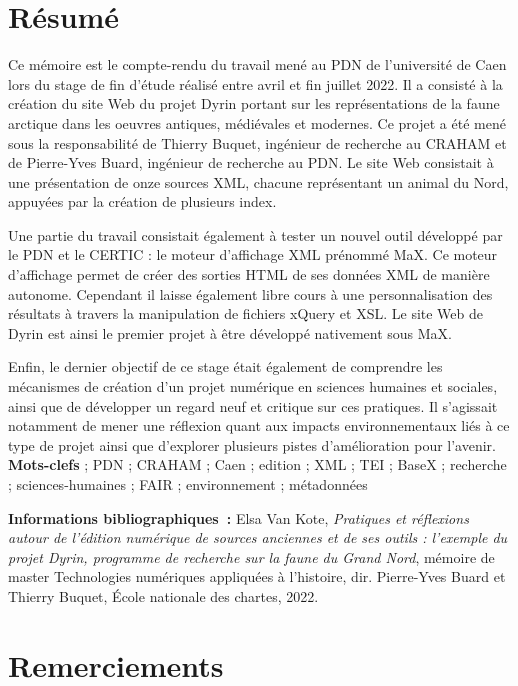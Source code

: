\documentclass[a4paper,12pt,twoside]{book}
\begin{document}
	\chapter{Résumé}
	\medskip
	Ce mémoire est le compte-rendu du travail mené au \acrfull{PDN} de l'université de Caen lors du stage de fin d'étude réalisé entre avril et fin juillet 2022. Il a consisté à la création du site Web du projet Dyrin portant sur les représentations de la faune arctique dans les oeuvres antiques, médiévales et modernes. Ce projet a été mené sous la responsabilité de Thierry Buquet, ingénieur de recherche au \acrfull{CRAHAM} et de Pierre-Yves Buard, ingénieur de recherche au \acrlong{PDN}. Le site Web consistait à une présentation de onze sources XML, chacune représentant un animal du Nord, appuyées par la création de plusieurs index.
	
	Une partie du travail consistait également à tester un nouvel outil développé par le \acrshort{PDN} et le \acrfull{CERTIC} : le moteur d'affichage XML prénommé MaX. Ce moteur d'affichage permet de créer des sorties HTML de ses données XML de manière autonome. Cependant il laisse également libre cours à une personnalisation des résultats à travers la manipulation de fichiers xQuery et XSL. Le site Web de Dyrin est ainsi le premier projet à être développé nativement sous MaX.
	
	Enfin, le dernier objectif de ce stage était également de comprendre les mécanismes de création d'un projet numérique en sciences humaines et sociales, ainsi que de développer un regard neuf et critique sur ces pratiques. Il s'agissait notamment de mener une réflexion quant aux impacts environnementaux liés à ce  type de projet ainsi que d'explorer plusieurs pistes d'amélioration pour l'avenir. \\
	
	\textbf{Mots-clefs} ; {PDN} ; {CRAHAM} ; {Caen} ; {edition} ; {XML} ; {TEI} ; {BaseX} ; {recherche} ; {sciences-humaines} ; {FAIR} ; {environnement} ; {métadonnées}
	
	\textbf{Informations bibliographiques~:} Elsa Van Kote, \textit{Pratiques et réflexions autour de l'édition numérique de sources anciennes et de ses outils : l'exemple du projet Dyrin, programme de recherche sur la faune du Grand Nord}, mémoire de master \og{}Technologies numériques appliquées à l'histoire\fg{}, dir. Pierre-Yves Buard et Thierry Buquet, École nationale des chartes, 2022.
	
	\chapter{Remerciements}
	
\end{document}
